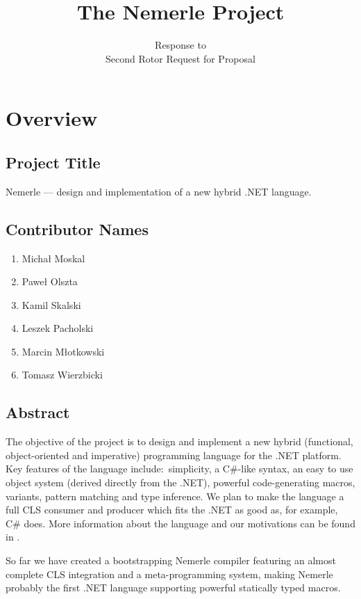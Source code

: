 \documentclass[a4paper,11pt]{article}
\title{The Nemerle Project}
\author{Response to\\Second Rotor Request for Proposal}
\date{}
\begin{document}
\maketitle
\thispagestyle{empty}

\section{Overview}

\subsection{Project Title}

Nemerle --- design and implementation of a new hybrid .NET language.

\subsection{Contributor Names}
\begin{enumerate}\itemsep0pt
\item Micha{\l} Moskal
\item Pawe{\l} Olszta
\item Kamil Skalski
\item Leszek Pacholski
\item Marcin M{\l}otkowski
\item Tomasz Wierzbicki
\end{enumerate}

\subsection{Abstract}

The objective of the project is to design and implement a new 
hybrid (functional, object-oriented and imperative) programming 
language for the .NET platform. Key features of the language 
include:~simplicity, a C\#-like syntax, an easy to use object 
system (derived directly from the .NET), powerful code-generating 
macros, variants, pattern matching and type inference. We plan 
to make the language a full CLS consumer and producer which 
fits the .NET as good as, for example, C\# does. More information
about the language and our motivations can be found in \cite{Intro}.

So far we have created a bootstrapping Nemerle compiler featuring
an almost complete CLS integration and a meta-programming system,
making Nemerle probably the first .NET language supporting powerful 
statically typed macros.
\end{document}
